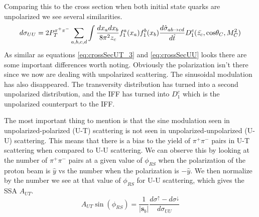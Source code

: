 \documentclass[abstract = on,listof=totoc, bibliography=totoc]{scrreprt}
\newcommand{\phirs}{\phi_{RS}}
\newcommand{\ptpair}{P_{T}^{\pi^+\pi^-}}
\newcommand{\pip}{\pi^+}
\newcommand{\pim}{\pi^-}
\newcommand{\pair}{$\pip\pim$ }
\begin{document}

Comparing this to the cross section when both initial state quarks are unpolarized we see several similarities.
\begin{equation}
\label{eq:crossSecUU}
d\sigma_{UU} = 2 \ptpair \sum_{a,b,c,d} \int \frac{dx_adx_b}{8\pi^2z_c} f_1^a(x_a)f_1^b(x_b) \frac{d\hat{\sigma}_{ab \rightarrow cd}}{d\hat{t}}D_1^c(\bar{z_c},\textnormal{cos}\theta_C,M_C^2)
\end{equation}
As similar as equations \ref{eq:crossSecUT_3} and \ref{eq:crossSecUU} looks there are some important differences worth noting. Obviously the polarization isn't there since we now are dealing with unpolarized scattering. The sinusoidal modulation has also disappeared. The transversity distribution has turned into a second unpolarized distribution, and the IFF has turned into $D_1^c$ which is the unpolarized counterpart to the IFF.   

The most important thing to mention is that the sine modulation seen in unpolarized-polarized (U-T) scattering is not seen in unpolarized-unpolarized (U-U) scattering. This means that there is a bias to the yield of \pair pairs in U-T scattering when compared to U-U scattering. We can observe this by looking at the number of \pair pairs at a given value of $\phirs$ when the polarization of the proton beam is $\hat{y}$ vs the number when the polarization is $-\hat{y}$. We then normalize by the number we see at that value of $\phirs$ for U-U scattering, which gives the SSA $A_{UT}$.
\begin{equation}
\label{eq:asymCS}
A_{UT} \sin (\phirs) =\frac{1}{|\bm{s}_b|} \frac{d\sigma^\uparrow - d\sigma^\downarrow}{d\sigma_{UU}}
\end{equation}
\end{document}
